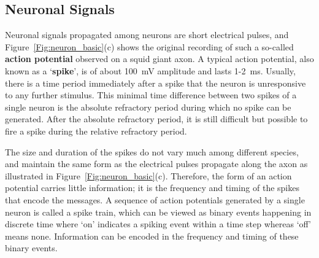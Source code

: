 %


\subsection{Neuronal Signals}
Neuronal signals propagated among neurons are short electrical pulses, and Figure~\ref{Fig:neuron_basic}(c) shows the original recording of such a so-called \textbf{action potential} observed on a squid giant axon.
A typical action potential, also known as a `\textbf{spike}', is of about 100~mV amplitude and lasts 1-2~ms.
Usually, there is a time period immediately after a spike that the neuron is unresponsive to any further stimulus.
This minimal time difference between two spikes of a single neuron is the absolute refractory period during which no spike can be generated.
After the absolute refractory period, it is still difficult but possible to 
fire a spike during the relative refractory period.

The size and duration of the spikes do not vary much among different species, and maintain the same form as the electrical pulses propagate along the axon as illustrated in Figure~\ref{Fig:neuron_basic}(c).
Therefore, the form of an action potential carries little information;
it is the frequency and timing of the spikes that encode the messages.
A sequence of action potentials generated by a single neuron is called a spike train, which can be viewed as binary events happening in discrete time where `on' indicates a spiking event within a time step whereas `off' means none.
Information can be encoded in the frequency and timing of these binary events.


